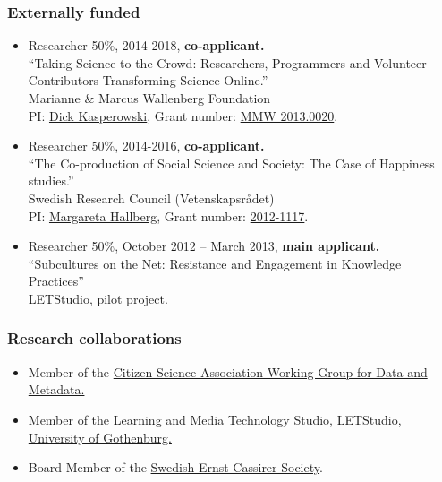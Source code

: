 \documentclass[a4paper,11pt,oneside]{article}
\begin{document}
    \subsubsection{Externally funded}
    \begin{itemize}
      \item Researcher 50\%, 2014-2018, \textbf{co-applicant.} \\
      ``Taking Science to the Crowd: Researchers, Programmers and Volunteer  \\
      Contributors Transforming Science Online.''\\ Marianne \& Marcus Wallenberg Foundation\\
      PI: \href{mailto:dick.kasperowski@gu.se}{Dick Kasperowski}, Grant number: \href{https://www.wallenberg.com/MMW/projektanslag-2013}{MMW 2013.0020}.
      \item Researcher 50\%, 2014-2016, \textbf{co-applicant.} \\
      ``The Co-production of Social Science and Society: The Case of Happiness studies.''  \\
      Swedish Research Council (Vetenskapsrådet)\\
      PI: \href{mailto:margareta.hallberg@gu.se}{Margareta Hallberg}, Grant number: \href{http://vrproj.vr.se/detail.asp?arendeid=90421}{2012-1117}.
      \item Researcher 50\%, October 2012 – March 2013, \textbf{main applicant.}\\
      ``Subcultures on the Net: Resistance and Engagement in Knowledge Practices''\\
      LETStudio, pilot project.
    \end{itemize}

    \subsubsection{Research collaborations}
    \begin{itemize}
      \item Member of the \href{https://citizenscienceassociation.org/overview/steering-committees/#metadata}{Citizen Science Association Working Group for Data and Metadata.}
      \item Member of the \href{http://letstudio.gu.se/members/christopher-kullenberg}{Learning and Media Technology Studio, LETStudio, University of Gothenburg.}
      \item Board Member of the \href{http://cassirer.se/sallskapet/styrelse/}{Swedish Ernst Cassirer Society}.
    \end{itemize}
\end{document}
